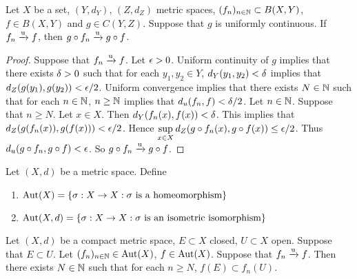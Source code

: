 \documentclass{book}
\begin{document}
\begin{ex} 
	Let $X$ be a set, $(Y, d_Y)$, $(Z, d_Z)$ metric spaces, $(f_n)_{n \in \mathbb{N}} \subset B(X, Y)$, $f \in B(X, Y)$ and $g \in C(Y, Z)$. Suppose that $g$ is uniformly continuous. If $f_n \xrightarrow{\text{u}} f$, then $g \circ f_n \xrightarrow{\text{u}} g \circ f$. 
\end{ex}

\begin{proof}
	Suppose that $f_n \xrightarrow{\text{u}} f$. Let $\epsilon >0$. Uniform continuity of $g$ implies that there exists $\delta >0$ such that for each $y_1, y_2 \in Y$, $d_Y(y_1, y_2) < \delta$ implies that $d_Z(g(y_1), g(y_2)) < \epsilon/2$.  Uniform convergence implies that there exists $N \in \mathbb{N}$ such that for each $n \in \mathbb{N}$, $n \geq \mathbb{N}$ implies that $d_u(f_n, f) < \delta/2$. Let $n \in \mathbb{N}$. Suppose that $n \geq N$. Let $x \in X$. Then $d_Y(f_n(x), f(x)) < \delta$. This implies that $d_Z(g(f_n(x)), g(f(x))) < \epsilon/2$. Hence $\sup\limits_{x \in X} d_Z(g \circ f_n(x), g \circ f(x)) \leq \epsilon/2$. Thus $d_u(g \circ f_n , g \circ f) < \epsilon$. So $g \circ f_n \xrightarrow{\text{u}} g \circ f$.
\end{proof}

\begin{defn} \ld{}
	Let $(X, d)$ be a metric space. Define
	\begin{enumerate}
		\item $\operatorname{Aut}(X) = \{\sigma:X \rightarrow X: \sigma \text{ is a homeomorphism}\}$
		\item $\operatorname{Aut}(X, d) = \{\sigma:X \rightarrow X: \sigma \text{ is an isometric isomorphism}\}$
	\end{enumerate}
\end{defn}

\begin{ex} \lex{}
	Let $(X, d)$ be a compact metric space, $E \subset X$ closed, $U \subset X$ open. Suppose that $E \subset U$. Let $(f_n)_{n \in \mathbb{N}} \in \operatorname{Aut}(X)$, $f \in \operatorname{Aut}(X)$.  Suppose that $f_n \xrightarrow{\text{u}} f$. Then there exists $N \in \mathbb{N}$ such that for each $n \geq N$, $f(E) \subset f_n(U)$.
\end{ex}
\end{document}
